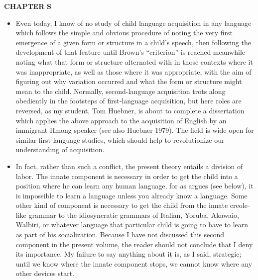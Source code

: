\begin{itemize}
\begin{itemize}
\begin{itemize}
\begin{itemize}
\begin{itemize}
\begin{itemize}
\begin{itemize}
\textbf{CHAPTER} \textbf{S}

\begin{itemize}
\item Even today, I know of no study of child language acquisition in any language which follows the simple and obvious procedure of noting the very first emergence of a given form or structure in a child's speech, then following the development of that feature until Brown's ``criterion'' is reached-meanwhile noting what that form or structure alternated with in those contexts where it was inappropriate, as well as those where it was appropriate, with the aim of figuring out why variation occurred and what the form or structure might mean to the child. Normally, second-language acquisition trots along obediently in the footsteps of first-language acquisition, but here roles are reversed, as my student, Tom Huebner, is about to complete a dissertation which applies the above approach to the acquisition of English by an immi\-grant Hmong speaker (see also Huebner 1979). The field is wide open for similar first-language studies, which should help to revolutionize our understanding of acquisition.
\item In fact, rather than such a conflict, the present theory entails a division of labor. The innate component is necessary in order to get the child into a position where he can learn any human language, for as \citet{Fodor1975} argues (see below), it is impossible to learn a language unless you already know a language. Some other kind of component is necessary to get the child from the innate creole-like grammar to the idiosyncratic grammars of Italian, Yoruba, Akawaio, Walbiri, or what\-ever language that particular child is going to have to learn as part of his socialization. Because I have not discussed this second component in the present volume, the reader should not conclude that I deny its importance. My failure to say anything about it is, as I said, strategic; until we know where the innate component stops, we cannot know where any other devices start.


\end{itemize}
\end{itemize}
\end{itemize}
\end{itemize}
\end{itemize}
\end{itemize}
\end{itemize}
\end{itemize}
